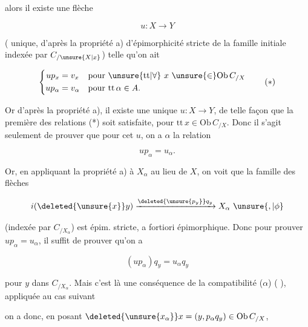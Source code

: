 alors il existe une flèche 

\[ u:X\longrightarrow Y \]

( unique, d'après la propriété a) d'épimorphicité stricte de la famille initiale indexée par $C_{/\unsure{X|x}}$) telle qu'on ait

{\makeatletter\tagsleft@true\makeatother
\[
\left\{\begin{aligned}
up_x&=v_x &&\text{pour }\unsure{\mathrm{tt}|\forall}\ x\ \unsure{\in}\mathrm{Ob}\,C_{/X}\\
up_\alpha&=v_\alpha &&\text{pour }\mathrm{tt}\,\alpha\in A.
\end{aligned}\right. \tag*{$(*)$}
\]
}

Or d'après la propriété a), il existe une unique $u:X\longrightarrow Y$, de telle façon que la première des relations (*) soit satisfaite, pour $\mathrm{tt}\,x\in\mathrm{Ob}\,C_{/X}$. Donc il s'agit seulement de prouver que pour cet $u$, on a  $\alpha$ la relation

\[ up_{\alpha}=u_{\alpha}. \]

Or, en appliquant la propriété a) à $X_\alpha$ au lieu de $X$, on voit que la famille des flèches

\[ i(\deleted{\unsure{x}}y)\xrightarrow{\deleted{\unsure{p_y}}q_y}X_\alpha\ \unsure{,|\phi} \]

(indexée par $C_{/X_\alpha}$) est épim. stricte, a fortiori épimorphique. Donc pour prouver $up_\alpha=u_\alpha$, il suffit de prouver qu'on a

{\makeatletter\tagsleft@true\makeatother
\[ (up_\alpha)q_y=u_\alpha q_y \tag*{$(**)$} \]
}

pour  $y$ dans $C_{/X_\alpha}$. Mais c'est là une conséquence de la compatibilité ($\alpha$) ( ), appliquée au cas suivant\unsure{:}


on a donc, en posant $\deleted{\unsure{x_\alpha}}x=(y,p_\alpha q_y)\in\mathrm{Ob}\,C_{/X}$,


